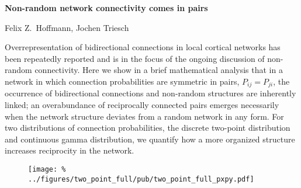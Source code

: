 \documentclass[paper=a4]{scrartcl}
\begin{document}
\begin{center}
{\Large{\textbf{ Non-random network connectivity comes in pairs }}}

\end{center}
\centerline{}
\centerline{Felix Z.~Hoffmann, Jochen Triesch}

\vspace{1cm}

Overrepresentation of bidirectional connections in local cortical networks has been repeatedly reported and is in the focus of the ongoing discussion of non-random connectivity. Here we show in a brief mathematical analysis that in a network in which connection probabilities are symmetric in pairs, $P_{ij} = P_{ji}$, the occurrence of bidirectional connections and non-random structures are inherently linked; an overabundance of reciprocally connected pairs emerges necessarily when the network structure deviates from a random network in any form. For two distributions of connection probabilities, the discrete two-point distribution and continuous gamma distribution, we quantify how a more organized structure increases reciprocity in the network.


\vspace{1cm}

\begin{figure}[h!]
  \centering
  \texttt{[image: \%
    ../figures/two\_point\_full/pub/two\_point\_full\_pxpy.pdf]} %
\end{figure}

\nocite{Song2005, Perin2011}

\printbibliography
\end{document}
